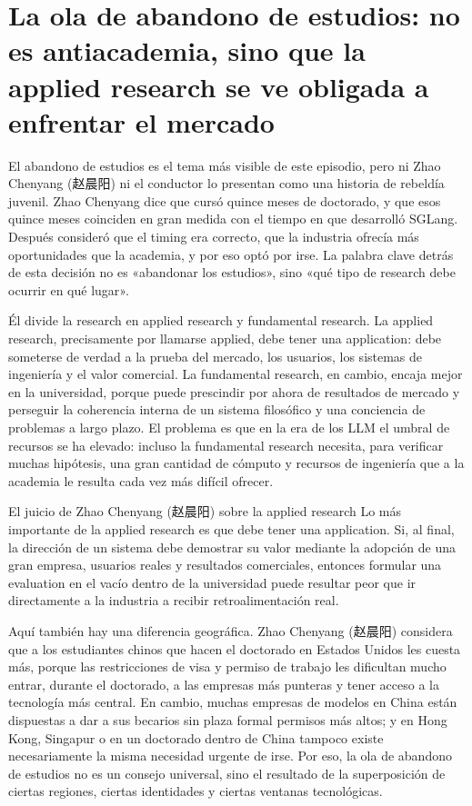 \documentclass[a4paper]{article}
\begin{document}
\section{La ola de abandono de estudios: no es antiacademia, sino que la applied research se ve obligada a enfrentar el mercado}

El abandono de estudios es el tema más visible de este episodio, pero ni Zhao Chenyang (赵晨阳) ni el conductor lo presentan como una historia de rebeldía juvenil. Zhao Chenyang dice que cursó quince meses de doctorado, y que esos quince meses coinciden en gran medida con el tiempo en que desarrolló SGLang. Después consideró que el timing era correcto, que la industria ofrecía más oportunidades que la academia, y por eso optó por irse. La palabra clave detrás de esta decisión no es «abandonar los estudios», sino «qué tipo de research debe ocurrir en qué lugar».

Él divide la research en applied research y fundamental research. La applied research, precisamente por llamarse applied, debe tener una application: debe someterse de verdad a la prueba del mercado, los usuarios, los sistemas de ingeniería y el valor comercial. La fundamental research, en cambio, encaja mejor en la universidad, porque puede prescindir por ahora de resultados de mercado y perseguir la coherencia interna de un sistema filosófico y una conciencia de problemas a largo plazo. El problema es que en la era de los LLM el umbral de recursos se ha elevado: incluso la fundamental research necesita, para verificar muchas hipótesis, una gran cantidad de cómputo y recursos de ingeniería que a la academia le resulta cada vez más difícil ofrecer.

\begin{importantbox}{El juicio de Zhao Chenyang (赵晨阳) sobre la applied research}
Lo más importante de la applied research es que debe tener una application. Si, al final, la dirección de un sistema debe demostrar su valor mediante la adopción de una gran empresa, usuarios reales y resultados comerciales, entonces formular una evaluation en el vacío dentro de la universidad puede resultar peor que ir directamente a la industria a recibir retroalimentación real.
\end{importantbox}

Aquí también hay una diferencia geográfica. Zhao Chenyang (赵晨阳) considera que a los estudiantes chinos que hacen el doctorado en Estados Unidos les cuesta más, porque las restricciones de visa y permiso de trabajo les dificultan mucho entrar, durante el doctorado, a las empresas más punteras y tener acceso a la tecnología más central. En cambio, muchas empresas de modelos en China están dispuestas a dar a sus becarios sin plaza formal permisos más altos; y en Hong Kong, Singapur o en un doctorado dentro de China tampoco existe necesariamente la misma necesidad urgente de irse. Por eso, la ola de abandono de estudios no es un consejo universal, sino el resultado de la superposición de ciertas regiones, ciertas identidades y ciertas ventanas tecnológicas.
\end{document}
